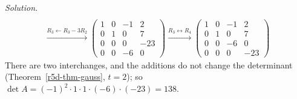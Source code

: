 \documentclass[12pt]{article}
\theoremstyle{definition}
\newenvironment{solution}{\par\noindent\textit{Solution.}\ }{\par\smallskip}
\begin{document}
\begin{solution}
\[\begin{gathered}
\\
\xrightarrow{R_3\leftarrow R_3-3R_2}
\begin{pmatrix}1&0&-1&2\\0&1&0&7\\0&0&0&-23\\0&0&-6&0\end{pmatrix}
\xrightarrow{R_3\leftrightarrow R_4}
\begin{pmatrix}1&0&-1&2\\0&1&0&7\\0&0&-6&0\\0&0&0&-23\end{pmatrix}
\end{gathered}
\]
There are two interchanges, and the additions do not change the determinant (Theorem~\ref{r5d-thm-gauss}, \(t=2\)); so
\(\det A=(-1)^2\cdot1\cdot1\cdot(-6)\cdot(-23)=138\).
\end{solution}
\end{document}

